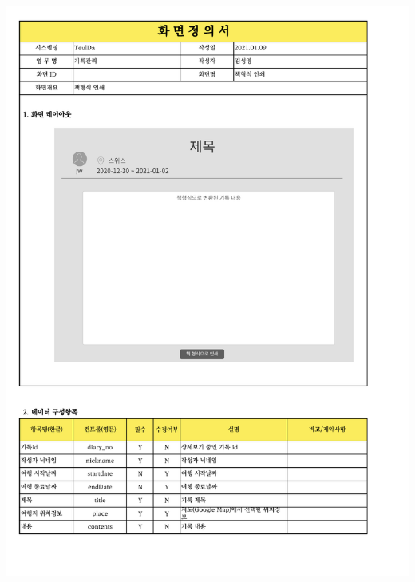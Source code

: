 {{{{{{{{{{{{{{{{{{{{{{{{\includegraphics[width=20cm]{./Figure/Analysis/Display/diary/diary_23.pdf} \\
}}}}}}}}}}}}}}}}}}}}}}}}
